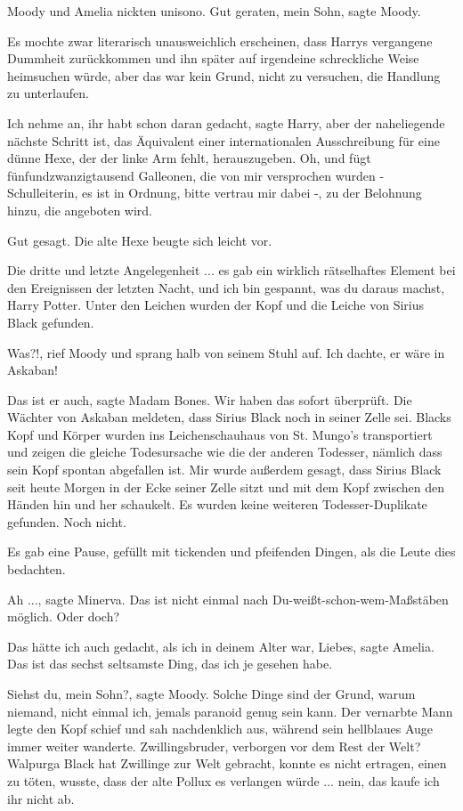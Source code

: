 Moody und Amelia nickten unisono. \glqq{}Gut geraten, mein Sohn\grqq{}, sagte
Moody.

Es mochte zwar literarisch unausweichlich erscheinen, dass Harrys vergangene
Dummheit zurückkommen und ihn später auf irgendeine schreckliche Weise
heimsuchen würde, aber das war kein Grund, nicht zu versuchen, die Handlung zu
unterlaufen.

\glqq{}Ich nehme an, ihr habt schon daran gedacht\grqq{}, sagte Harry, \glqq{}aber
der naheliegende nächste Schritt ist, das Äquivalent einer internationalen
Ausschreibung für eine dünne Hexe, der der linke Arm fehlt, herauszugeben. Oh,
und fügt fünfundzwanzigtausend Galleonen, die von mir versprochen wurden -
Schulleiterin, es ist in Ordnung, bitte vertrau mir dabei -, zu der Belohnung
hinzu, die angeboten wird.\grqq{}

\glqq{}Gut gesagt.\grqq{} Die alte Hexe beugte sich leicht vor.

\glqq{}Die dritte und letzte Angelegenheit ... es gab ein wirklich rätselhaftes
Element bei den Ereignissen der letzten Nacht, und ich bin gespannt, was du
daraus machst, Harry Potter. Unter den Leichen wurden der Kopf und die Leiche
von Sirius Black gefunden.\grqq{}

\glqq{}Was?!\grqq{}, rief Moody und sprang halb von seinem Stuhl auf. \glqq{}Ich
dachte, er wäre in Askaban!\grqq{}

\glqq{}Das ist er auch\grqq{}, sagte Madam Bones. \glqq{}Wir haben das sofort
überprüft. Die Wächter von Askaban meldeten, dass Sirius Black noch in seiner
Zelle sei. Blacks Kopf und Körper wurden ins Leichenschauhaus von St. Mungo's
transportiert und zeigen die gleiche Todesursache wie die der anderen Todesser,
nämlich dass sein Kopf spontan abgefallen ist. Mir wurde außerdem gesagt, dass
Sirius Black seit heute Morgen in der Ecke seiner Zelle sitzt und mit dem Kopf
zwischen den Händen hin und her schaukelt. Es wurden keine weiteren
Todesser-Duplikate gefunden. Noch nicht.\grqq{}

Es gab eine Pause, gefüllt mit tickenden und pfeifenden Dingen, als die Leute
dies bedachten.

\glqq{}Ah ...\grqq{}, sagte Minerva. \glqq{}Das ist nicht einmal nach
Du-weißt-schon-wem-Maßstäben möglich. Oder doch?\grqq{}

\glqq{}Das hätte ich auch gedacht, als ich in deinem Alter war, Liebes\grqq{},
sagte Amelia. \glqq{}Das ist das sechst seltsamste Ding, das ich je gesehen
habe.\grqq{}

\glqq{}Siehst du, mein Sohn?\grqq{}, sagte Moody. \glqq{}Solche Dinge sind der
Grund, warum niemand, nicht einmal ich, jemals paranoid genug sein kann.\grqq{} Der
vernarbte Mann legte den Kopf schief und sah nachdenklich aus, während sein
hellblaues Auge immer weiter wanderte. \glqq{}Zwillingsbruder, verborgen vor dem
Rest der Welt? Walpurga Black hat Zwillinge zur Welt gebracht, konnte es nicht
ertragen, einen zu töten, wusste, dass der alte Pollux es verlangen würde ...
nein, das kaufe ich ihr nicht ab.\grqq{}


